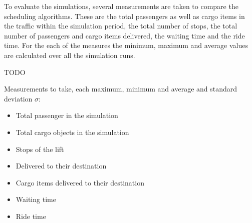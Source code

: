 To evaluate the simulations, several measurements are taken to compare the scheduling algorithms.
These are the total passengers as well as cargo items in the traffic within the simulation period, the total number of stops, the total number of passengers and cargo items delivered, the waiting time and the ride time.  
For the each of the measures the minimum, maximum and average values are calculated over all the simulation runs.  

TODO

Measurements to take, each maximum, minimum and average and standard deviation $ \sigma{} $:
\begin{samepage}
\begin{itemize}
    \item Total passenger in the simulation
    \item Total cargo objects in the simulation
    \item Stops of the lift
    \item Delivered to their destination
    \item Cargo items delivered to their destination
    \item Waiting time
    \item Ride time
\end{itemize}
\end{samepage}
 

